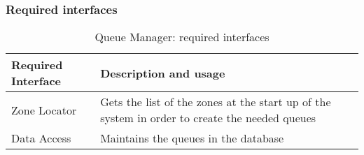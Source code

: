\subsubsection{Required interfaces}
\begin{table}[H]
	\begin{longtable}{| l | p{} |}
		\hline
		\textbf{Required Interface} & \textbf{Description and usage} \\ \hline
		Zone Locator & Gets the list of the zones at the start up of the system in order to create the needed queues \\ \hline
		Data Access & Maintains the queues in the database \\ \hline
	\end{longtable}
	\caption{Queue Manager: required interfaces}
	\label{tab:queuemanager:requiredInterfaces}
\end{table}

